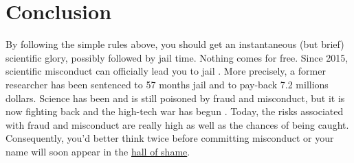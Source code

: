 \documentclass[a4paper,10pt,onecolumn]{article}
\begin{document}
\section*{Conclusion}

By following the simple rules above, you should get an instantaneous (but
brief) scientific glory, possibly followed by jail time. Nothing comes
for free. Since 2015, scientific misconduct can officially lead you to jail
\citep{grant:2015}. More precisely, a former researcher has been sentenced to
57 months jail and to pay-back 7.2 millions dollars. Science has been and is
still poisoned by fraud and misconduct, but it is now fighting back and the
high-tech war has begun \citep{buranyi:2017}. Today, the risks associated with
fraud and misconduct are really high as well as the chances of being
caught. Consequently, you'd better think twice before committing misconduct or
your name will soon appear in the
\href{https://en.wikipedia.org/wiki/Scientific_misconduct#Notable_individual_cases}{hall of shame}.


\renewcommand*{\bibfont}{\small}
\printbibliography[title=References]
\end{document}
